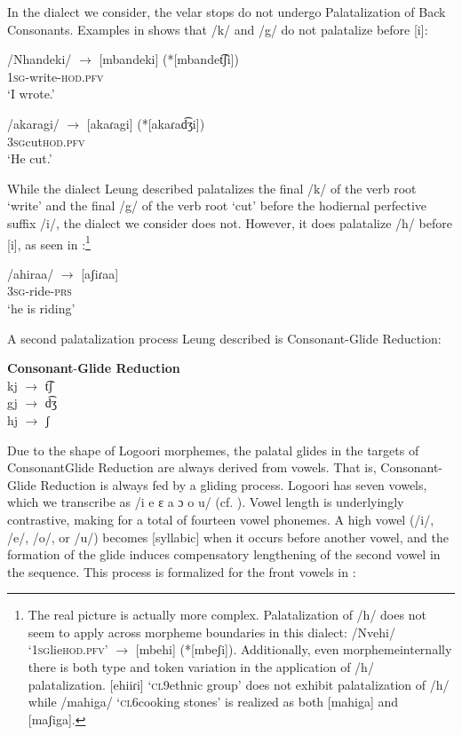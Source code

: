 \documentclass[output=paper]{langsci/langscibook}
\begin{document}
In the dialect we consider, the velar stops do not undergo Palatalization of Back Consonants. Examples in  shows that /k/ and /g/ do not palatalize before [i]:


\ea\label{ex:glewwe:5}{}
   \ea{} 
 /Nhandeki/  $\rightarrow$  [mbandeki]  (*[mbandet͡ʃi])  \\{}
\textsc{1sg}-write-\textsc{hod.pfv}\\{}
\glt ‘I wrote.’ 

\ex{}
 /akaragi/  $\rightarrow$  \textsc{[}akaɾagi]  (*[akaɾad͡ʒi])\\{}
\textsc{3sg}cut\textsc{hod.pfv}\\{}
\glt ‘He cut.’\\{}
\z
\z 

While the dialect Leung described palatalizes the final /k/ of the verb root ‘write’ and the final /g/ of the verb root ‘cut’ before the hodiernal perfective suffix /i/, the dialect we consider does not. However, it does palatalize /h/ before [i], as seen in :\footnote{The real picture is actually more complex. Palatalization of /h/ does not seem to apply across morpheme boundaries in this dialect: /Nvehi/ ‘1\textsc{sg}lie\textsc{hod.pfv}’ $\rightarrow$ [mbehi] (*[mbeʃi]). Additionally, even morphemeinternally there is both type and token variation in the application of /h/ palatalization. [ehiiɾi] ‘\textsc{cl}9ethnic group’ does not exhibit palatalization of /h/ while /mahiga/ ‘\textsc{cl}6cooking stones’ is realized as both [mahiga] and [maʃiga].} 

\ea\label{ex:glewwe:6}{}
 /ahiraa/  $\rightarrow$  [aʃiɾaa]\\{}
\textsc{3sg}-ride-\textsc{prs}\\{}
\glt ‘he is riding’
\z

A second palatalization process Leung described is Consonant-Glide Reduction:

\ea\label{ex:glewwe:7}{} 
 \textbf{Consonant}-\textbf{Glide Reduction} \citep[116]{Leung1991}\\{}
kj $\rightarrow$ t͡ʃ \\{}
gj $\rightarrow$ d͡ʒ \\{}
hj $\rightarrow$ ʃ \\{}
\z

Due to the shape of Logoori morphemes, the palatal glides in the targets of ConsonantGlide Reduction are always derived from vowels. That is, Consonant-Glide Reduction is always fed by a gliding process. Logoori has seven vowels, which we transcribe as /i e ɛ a ɔ o u/ (cf. \citealt{Leung1991}). Vowel length is underlyingly contrastive, making for a total of fourteen vowel phonemes. A high vowel (/i/, /e/, /o/, or /u/) becomes [syllabic] when it occurs before another vowel, and the formation of the glide induces compensatory lengthening of the second vowel in the sequence. This process is formalized for the front vowels in :
\end{document}
